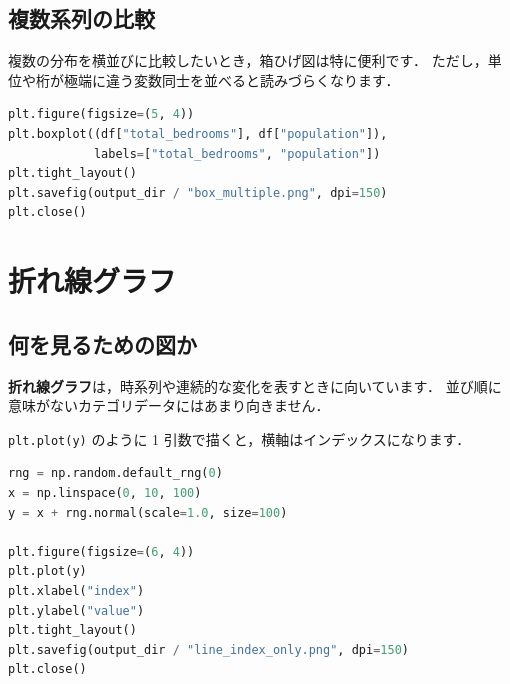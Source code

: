 
\subsection{複数系列の比較}

複数の分布を横並びに比較したいとき，箱ひげ図は特に便利です．
ただし，単位や桁が極端に違う変数同士を並べると読みづらくなります．

\begin{lstlisting}[style=codecell,language=Python]
plt.figure(figsize=(5, 4))
plt.boxplot((df["total_bedrooms"], df["population"]),
            labels=["total_bedrooms", "population"])
plt.tight_layout()
plt.savefig(output_dir / "box_multiple.png", dpi=150)
plt.close()
\end{lstlisting}



\section{折れ線グラフ}

\subsection{何を見るための図か}

\textbf{折れ線グラフ}は，時系列や連続的な変化を表すときに向いています．
並び順に意味がないカテゴリデータにはあまり向きません．

\texttt{plt.plot(y)} のように 1 引数で描くと，横軸はインデックスになります．

\begin{lstlisting}[style=codecell,language=Python]
rng = np.random.default_rng(0)
x = np.linspace(0, 10, 100)
y = x + rng.normal(scale=1.0, size=100)

plt.figure(figsize=(6, 4))
plt.plot(y)
plt.xlabel("index")
plt.ylabel("value")
plt.tight_layout()
plt.savefig(output_dir / "line_index_only.png", dpi=150)
plt.close()
\end{lstlisting}


